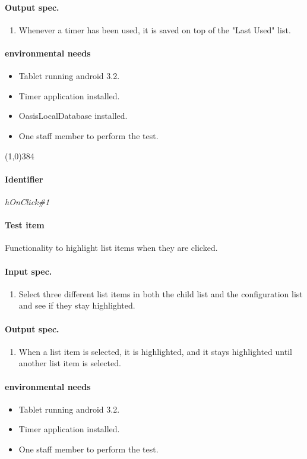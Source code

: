 \paragraph{Output spec.}
	\begin{enumerate}
		\item Whenever a timer has been used, it is saved on top of the "Last Used" list.
	\end{enumerate}
\paragraph{environmental needs}
	\begin{itemize}
		\item Tablet running android 3.2.
		\item Timer application installed.
		\item OasisLocalDatabase installed.
		\item One staff member to perform the test.
	\end{itemize}
\begin{center}
	\line(1,0){384}
\end{center}

\pagebreak
\paragraph{Identifier}
	\textit{hOnClick\#1}
\paragraph{Test item}
	Functionality to highlight list items when they are clicked.
\paragraph{Input spec.}
	\begin{enumerate}
		\item Select three different list items in both the child list and the configuration list and see if they stay highlighted.
	\end{enumerate}
\paragraph{Output spec.}
	\begin{enumerate}
		\item When a list item is selected, it is highlighted, and it stays highlighted until another list item is selected.
	\end{enumerate}
\paragraph{environmental needs}
	\begin{itemize}
		\item Tablet running android 3.2.
		\item Timer application installed.
		\item One staff member to perform the test.
	\end{itemize}
